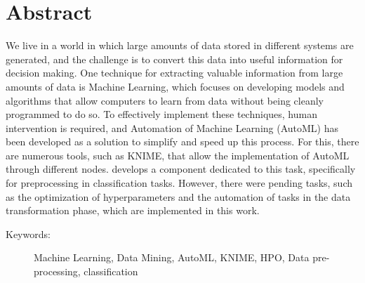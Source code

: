 \section*{Abstract}
We live in a world in which large amounts of data stored in different systems are generated, and the challenge is to convert this data into useful information for decision making. One technique for extracting valuable information from large amounts of data is Machine Learning, which focuses on developing models and algorithms that allow computers to learn from data without being cleanly programmed to do so. To effectively implement these techniques, human intervention is required, and Automation of Machine Learning (AutoML) has been developed as a solution to simplify and speed up this process. For this, there are numerous tools, such as KNIME, that allow the implementation of AutoML through different nodes. \citep{Carrazana2022} develops a component dedicated to this task, specifically for preprocessing in classification tasks. However, there were pending tasks, such as the optimization of hyperparameters and the automation of tasks in the data transformation phase, which are implemented in this work.

\begin{description}
	\item[Keywords:]{Machine Learning, Data Mining, AutoML, KNIME, HPO, Data pre-processing, classification}
\end{description}

